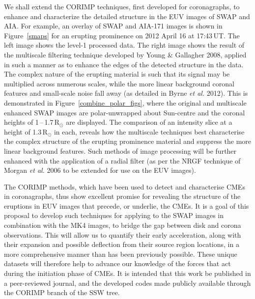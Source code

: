 \documentclass[preprint2]{aastex}
\begin{document}



We shall extend the CORIMP techniques, first developed for coronagraphs, to enhance and characterize the detailed structure in the EUV images of SWAP and AIA. For example, an overlay of SWAP and AIA-171 images is shown in Figure~\ref{smaps} for an erupting prominence on 2012 April 16 at 17:43\,UT. The left image shows the level-1 processed data. The right image shows the result of the multiscale filtering technique developed by Young \& Gallagher 2008, applied in such a manner as to enhance the edges of the detected structure in the data. The complex nature of the erupting material is such that its signal may be multiplied across numerous scales, while the more linear background coronal features and small-scale noise fall away (as detailed in Byrne \emph{et al.} 2012). This is demonstrated in Figure~\ref{combine_polar_figs}, where the original and multiscale enhanced SWAP images are polar-unwrapped about Sun-centre and the coronal heights of 1\,--\,1.7\,R$_\odot$ are displayed. The comparison of an intensity slice at a height of 1.3\,R$_\odot$ in each, reveals how the multiscale techniques best characterise the complex structure of the erupting prominence material and suppress the more linear background features. Such methods of image processing will be further enhanced with the application of a radial filter (as per the NRGF technique of Morgan \emph{et al.} 2006 to be extended for use on the EUV images).


The CORIMP methods, which have been used to detect and characterise CMEs in coronagraphs, thus show excellent promise for revealing the structure of the eruptions in EUV images that precede, or underlie, the CMEs. It is a goal of this proposal to develop such techniques for applying to the SWAP images in combination with the MK4 images, to bridge the gap between disk and corona observations. This will allow us to quantify their early acceleration, along with their expansion and possible deflection from their source region locations, in a more comprehensive manner than has been previously possible. These unique datasets will therefore help to advance our knowledge of the forces that act during the initiation phase of CMEs. It is intended that this work be published in a peer-reviewed journal, and the developed codes made publicly available through the CORIMP branch of the SSW tree.
\end{document}
